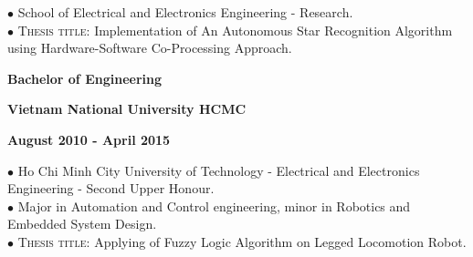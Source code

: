 \documentclass[10pt]{article}
\begin{document}
        $\bullet$ {School of Electrical and Electronics Engineering - Research.} \\
        $\bullet$ \textsc{Thesis title}: Implementation of An Autonomous Star Recognition Algorithm using Hardware-Software Co-Processing Approach.


        \begin{multicols}{3}
            \begin{flushleft}
                \textbf{Bachelor of Engineering}
            \end{flushleft}

            \columnbreak

            \begin{center}
                \textbf{Vietnam National University HCMC}
            \end{center}

            \columnbreak

            \begin{flushright}
                \textbf{August 2010 - April 2015}
            \end{flushright}
        \end{multicols}

        \vspace{-5mm}

        $\bullet$ {Ho Chi Minh City University of Technology - Electrical and Electronics Engineering - Second Upper Honour.} \\
        $\bullet$ {Major in Automation and Control engineering, minor in Robotics and Embedded System Design.} \\
        $\bullet$ \textsc{Thesis title}: Applying of Fuzzy Logic Algorithm on Legged Locomotion Robot.


    \newpage

    \vspace{2mm}
\end{document}
